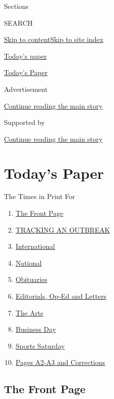 Sections

SEARCH

\protect\hyperlink{site-content}{Skip to
content}\protect\hyperlink{site-index}{Skip to site index}

\href{https://www.nytimes.com/section/todayspaper}{Today's paper}

\href{https://myaccount.nytimes.com/auth/login?response_type=cookie\&client_id=vi}{}

\href{https://www.nytimes.com/section/todayspaper}{Today's Paper}

Advertisement

\protect\hyperlink{after-top}{Continue reading the main story}

Supported by

\protect\hyperlink{after-sponsor}{Continue reading the main story}

\hypertarget{todays-paper}{%
\section{Today's Paper}\label{todays-paper}}

The Times in Print For

\begin{enumerate}
\def\labelenumi{\arabic{enumi}.}
\tightlist
\item
  \protect\hyperlink{thefrontpage}{The Front Page}
\item
  \protect\hyperlink{trackinganoutbreak}{TRACKING AN OUTBREAK}
\item
  \protect\hyperlink{international}{International}
\item
  \protect\hyperlink{national}{National}
\item
  \protect\hyperlink{obituaries}{Obituaries}
\item
  \protect\hyperlink{editorialsux2cop-edandletters}{Editorials, Op-Ed
  and Letters}
\item
  \protect\hyperlink{thearts}{The Arts}
\item
  \protect\hyperlink{businessday}{Business Day}
\item
  \protect\hyperlink{sportssaturday}{Sports Saturday}
\item
  \protect\hyperlink{pagesa2-a3andcorrections}{Pages A2-A3 and
  Corrections}
\end{enumerate}

\hypertarget{the-front-page}{%
\subsection{The Front Page}\label{the-front-page}}

